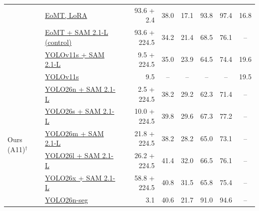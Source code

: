 \begin{table}[t]
{\begin{tabular}{l|lrccccc}
 & \hyperlink{abl:F4}{EoMT, LoRA} & 93.6 + 2.4 & 38.0 & 17.1 & 93.8 & 97.4 & 16.8 \\
 & \hyperlink{abl:F1}{EoMT + SAM 2.1-L (control)} & 93.6 + 224.5 & 34.2 & 21.4 & 68.5 & 76.1 & -- \\
 & \hyperlink{abl:F2}{YOLOv11s + SAM 2.1-L} & 9.5 + 224.5 & 35.0 & 23.9 & 64.5 & 74.4 & 19.6 \\
 & \hyperlink{abl:A10}{YOLOv11s} & 9.5 & -- & -- & -- & -- & 19.5 \\
\midrule
\multirow{10}{*}{Ours (A11)$^\dagger$} & \hyperlink{abl:A11}{YOLO26n + SAM 2.1-L} & 2.5 + 224.5 & 38.2 & 29.2 & 62.3 & 71.4 & -- \\
 & \hyperlink{abl:A11}{YOLO26s + SAM 2.1-L} & 10.0 + 224.5 & 39.8 & 29.6 & 67.3 & 77.2 & -- \\
 & \hyperlink{abl:A11}{YOLO26m + SAM 2.1-L} & 21.8 + 224.5 & 38.2 & 28.2 & 65.0 & 73.1 & -- \\
 & \hyperlink{abl:A11}{YOLO26l + SAM 2.1-L} & 26.2 + 224.5 & 41.4 & 32.0 & 66.5 & 76.1 & -- \\
 & \hyperlink{abl:A11}{YOLO26x + SAM 2.1-L} & 58.8 + 224.5 & 40.8 & 31.5 & 65.8 & 75.4 & -- \\
 & \hyperlink{abl:A11}{YOLO26n-seg} & 3.1 & 40.6 & 21.7 & 91.0 & 94.6 & -- \\

\end{tabular}}
\end{table}
